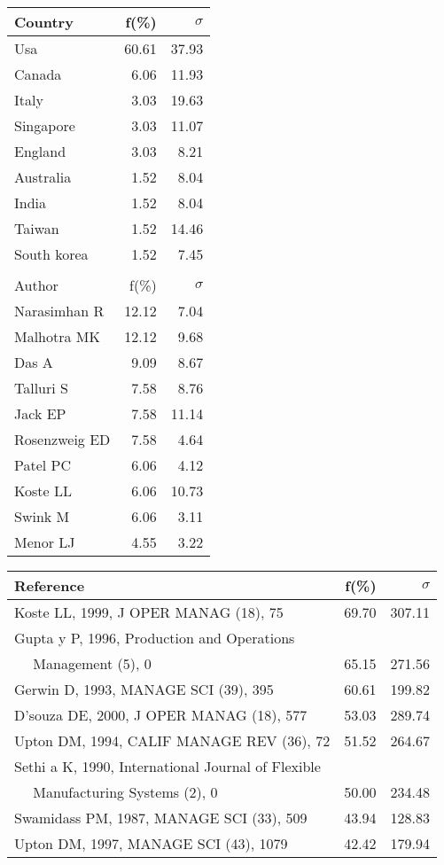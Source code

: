 \documentclass[a4paper,11pt]{report}
\begin{document}
\begin{landscape}
\begin{table}[!ht]
{\begin{tabular}{|l r r|}
Country & f(\%) & $\sigma$\\
\hline
Usa & 60.61 & 37.93\\
Canada & 6.06 & 11.93\\
Italy & 3.03 & 19.63\\
Singapore & 3.03 & 11.07\\
England & 3.03 & 8.21\\
Australia & 1.52 & 8.04\\
India & 1.52 & 8.04\\
Taiwan & 1.52 & 14.46\\
South korea & 1.52 & 7.45\\
 &  & \\
\hline
\hline
Author & f(\%) & $\sigma$\\
\hline
Narasimhan R & 12.12 & 7.04\\
Malhotra MK & 12.12 & 9.68\\
Das A & 9.09 & 8.67\\
Talluri S & 7.58 & 8.76\\
Jack EP & 7.58 & 11.14\\
Rosenzweig ED & 7.58 & 4.64\\
Patel PC & 6.06 & 4.12\\
Koste LL & 6.06 & 10.73\\
Swink M & 6.06 & 3.11\\
Menor LJ & 4.55 & 3.22\\
\hline
\end{tabular}
}
{\scriptsize\begin{tabular}{|l r r|}
\hline
Reference & f(\%) & $\sigma$\\
\hline
Koste LL, 1999, J OPER MANAG (18), 75 & 69.70 & 307.11\\
Gupta y P, 1996, Production and Operations &  & \\
$\quad$ Management (5), 0 & 65.15 & 271.56\\
Gerwin D, 1993, MANAGE SCI (39), 395 & 60.61 & 199.82\\
D'souza DE, 2000, J OPER MANAG (18), 577 & 53.03 & 289.74\\
Upton DM, 1994, CALIF MANAGE REV (36), 72 & 51.52 & 264.67\\
Sethi a K, 1990, International Journal of Flexible &  & \\
$\quad$ Manufacturing Systems (2), 0 & 50.00 & 234.48\\
Swamidass PM, 1987, MANAGE SCI (33), 509 & 43.94 & 128.83\\
Upton DM, 1997, MANAGE SCI (43), 1079 & 42.42 & 179.94\\

\end{tabular}}
\end{table}
\end{landscape}
\end{document}
